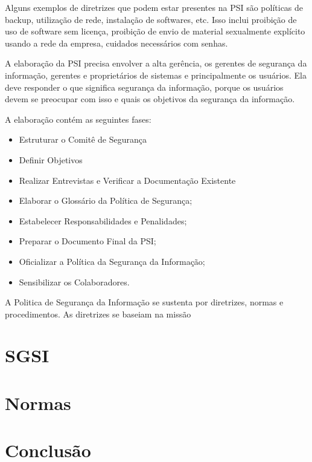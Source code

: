 \documentclass[12pt]{article}
\begin{document}
Alguns exemplos de diretrizes que podem estar presentes na PSI são políticas de backup, utilização de rede, instalação de softwares, etc.
Isso inclui proibição de uso de software sem licença, proibição de envio de material sexualmente explícito usando a rede da empresa, cuidados necessários com senhas.

A elaboração da PSI precisa envolver a alta gerência, os gerentes de segurança da informação, gerentes e proprietários
de sistemas e principalmente os usuários. Ela deve responder o que significa segurança da informação,
porque os usuários devem se preocupar com isso e quais os objetivos da segurança da informação. 

A elaboração contém as seguintes fases:
\begin{itemize}
  \item Estruturar o Comitê de Segurança
  \item Definir Objetivos
  \item Realizar Entrevistas e Verificar a Documentação Existente 
  \item Elaborar o Glossário da Política de Segurança;
  \item Estabelecer Responsabilidades e Penalidades;
  \item Preparar o Documento Final da PSI;
  \item Oficializar a Política da Segurança da Informação;
  \item Sensibilizar os Colaboradores.
\end{itemize}

A Politica de Segurança da Informação se sustenta por diretrizes, normas e procedimentos.
As diretrizes se baseiam na missão

\section{SGSI}


\section{Normas}

\section{Conclusão}


\newpage



\end{document}
